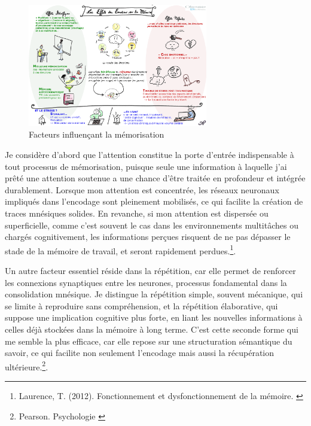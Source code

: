 \documentclass[11pt,a4paper]{report}
\begin{document}
\begin{figure}[h]
    \centering
    \includegraphics[width=0.7\textwidth]{images/1.1.2.png}
    \caption{Facteurs influençant la mémorisation}
    \label{fig:1.1.2}
\end{figure}

Je considère d’abord que l’attention constitue la porte d’entrée indispensable à tout processus de mémorisation, puisque seule une information à laquelle j’ai prêté une attention soutenue a une chance d’être traitée en profondeur et intégrée durablement. Lorsque mon attention est concentrée, les réseaux neuronaux impliqués dans l’encodage sont pleinement mobilisés, ce qui facilite la création de traces mnésiques solides. En revanche, si mon attention est dispersée ou superficielle, comme c’est souvent le cas dans les environnements multitâches ou chargés cognitivement, les informations perçues risquent de ne pas dépasser le stade de la mémoire de travail, et seront rapidement perdues.\footnote{Laurence, T. (2012). Fonctionnement et dysfonctionnement de la mémoire. \cite{taconnat}}.

Un autre facteur essentiel réside dans la répétition, car elle permet de renforcer les connexions synaptiques entre les neurones, processus fondamental dans la consolidation mnésique. Je distingue la répétition simple, souvent mécanique, qui se limite à reproduire sans compréhension, et la répétition élaborative, qui suppose une implication cognitive plus forte, en liant les nouvelles informations à celles déjà stockées dans la mémoire à long terme. C’est cette seconde forme qui me semble la plus efficace, car elle repose sur une structuration sémantique du savoir, ce qui facilite non seulement l’encodage mais aussi la récupération ultérieure.\footnote{Pearson. Psychologie \cite{pearson}}.
\end{document}
